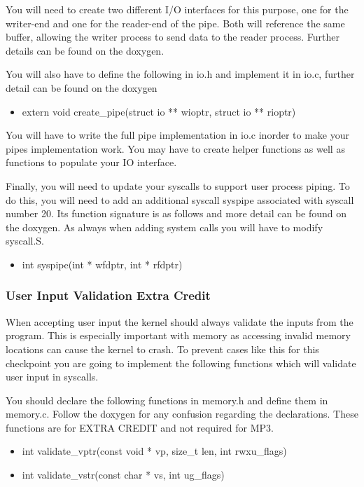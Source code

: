 \documentclass{article}
\begin{document}
	You will need to create two different I/O interfaces for this purpose, one for the writer-end and one for the reader-end of the pipe. Both will reference the same buffer, allowing the
	writer process to send data to the reader process. Further details can be found on the doxygen.


	You will also have to define the following in {\fix io.h} and implement it in {\fix io.c}, further detail can be found on the doxygen
		\begin {itemize}
			\item {\fix extern void create\_pipe(struct io ** wioptr, struct io ** rioptr)}
		\end{itemize}
	You will have to write the full pipe implementation in {\fix io.c} inorder to make your pipes implementation work. You may have to create helper functions 
	as well as functions to populate your IO interface.

	Finally, you will need to update your syscalls to support user process piping. To do this, you will need to add an additional syscall {\fix syspipe} associated with syscall number 20.
	Its function signature is as follows and more detail can be found on the doxygen.
	As always when adding system calls you will have to modify {\fix syscall.S}. 
		\begin {itemize}
			\item {\fix int syspipe(int * wfdptr, int * rfdptr)}
		\end{itemize}
	
	\subsubsection{User Input Validation Extra Credit} 
	When accepting user input the kernel should always validate the inputs from the program. This is especially important with memory as accessing invalid memory locations 
	can cause the kernel to crash. To prevent cases like this for this checkpoint you are going to implement the following functions which will validate user input in syscalls. 

	You should declare the following functions in {\fix memory.h} and define them in {\fix memory.c}. Follow the doxygen for any confusion regarding the declarations.
	These functions are for EXTRA CREDIT and not required for MP3.

	\begin{itemize}
		\item {\fix int validate\_vptr(const void * vp, size\_t len, int rwxu\_flags)}
		\item {\fix int validate\_vstr(const char * vs, int ug\_flags)}
	\end{itemize}
\end{document}
